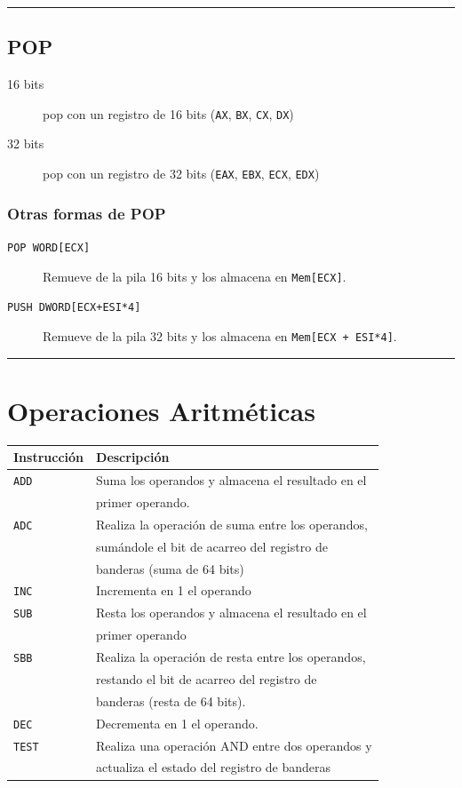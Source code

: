 \documentclass[12pt]{article}
\begin{document}
\noindent\rule{\textwidth}{0.5pt}

\subsection*{POP}
\label{sec:org082b76b}
\begin{description}
\item[{16 bits}] pop con un registro de 16 bits (\texttt{AX}, \texttt{BX}, \texttt{CX}, \texttt{DX})
\item[{32 bits}] pop con un registro de 32 bits (\texttt{EAX}, \texttt{EBX}, \texttt{ECX}, \texttt{EDX})
\end{description}

\subsubsection*{Otras formas de POP}
\label{sec:org3d65dc5}
\begin{description}
\item[{\texttt{POP WORD[ECX]}}] Remueve de la pila 16 bits y los almacena en \texttt{Mem[ECX]}.
\item[{\texttt{PUSH DWORD[ECX+ESI*4]}}] Remueve de la pila 32 bits y los almacena en \texttt{Mem[ECX + ESI*4]}.
\end{description}

\noindent\rule{\textwidth}{0.5pt}

\section*{Operaciones Aritméticas}
\label{sec:orgf3997c0}
\begin{center}
\begin{tabular}{|l|l|}
\hline
Instrucción & Descripción\\
\hline
\texttt{ADD} & Suma los operandos y almacena el resultado en el\\
 & primer operando.\\
\hline
\texttt{ADC} & Realiza la operación de suma entre los operandos,\\
 & sumándole el bit de acarreo del registro de\\
 & banderas (suma de 64 bits)\\
\hline
\texttt{INC} & Incrementa en 1 el operando\\
\hline
\texttt{SUB} & Resta los operandos y almacena el resultado en el\\
 & primer operando\\
\hline
\texttt{SBB} & Realiza la operación de resta entre los operandos,\\
 & restando el bit de acarreo del registro de\\
 & banderas (resta de 64 bits).\\
\hline
\texttt{DEC} & Decrementa en 1 el operando.\\
\hline
\texttt{TEST} & Realiza una operación AND entre dos operandos y\\
 & actualiza el estado del registro de banderas\\
\hline
\end{tabular}
\end{center}
\end{document}
